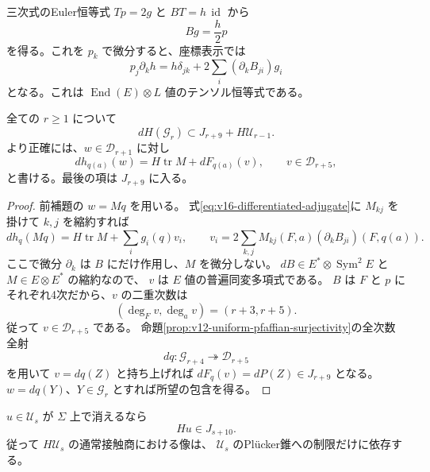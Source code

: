 三次式のEuler恒等式 $Tp=2g$ と $BT=h\,\operatorname{id}$ から
\begin{equation}\label{eq:v16-adjugate-euler}
 B g=\frac h2p
\end{equation}
を得る。これを $p_k$ で微分すると、座標表示では
\begin{equation}\label{eq:v16-differentiated-adjugate}
 p_j\partial_k h
   =h\delta_{jk}+2\sum_i(\partial_k B_{ji})g_i
\end{equation}
となる。これは $\operatorname{End}(E)\otimes L$ 値のテンソル恒等式である。

\begin{proposition}[Hessianの一次作用の全次数簡約]
\label{prop:v16-hessian-derivation-reduction}
全ての $r\ge1$ について
\begin{equation}\label{eq:v16-all-hessian-action-mod-units}
 dH(\mathcal G_r)\subset J_{r+9}+H\mathcal U_{r-1}.
\end{equation}
より正確には、$w\in\mathcal D_{r+1}$ に対し
\[
 dh_{q(a)}(w)=H\operatorname{tr}M+dF_{q(a)}(v),\qquad
 v\in\mathcal D_{r+5},
\]
と書ける。最後の項は $J_{r+9}$ に入る。
\end{proposition}

\begin{proof}
前補題の $w=Mq$ を用いる。
式\eqref{eq:v16-differentiated-adjugate}に $M_{kj}$ を掛けて $k,j$ を縮約すれば
\[
 dh_q(Mq)=H\operatorname{tr}M+\sum_i g_i(q)v_i,
 \qquad
 v_i=2\sum_{k,j}M_{kj}(F,a)(\partial_kB_{ji})(F,q(a)).
\]
ここで微分 $\partial_k$ は $B$ にだけ作用し、$M$ を微分しない。
$dB\in E^*\otimes\operatorname{Sym}^2E$ と $M\in E\otimes E^*$ の縮約なので、
$v$ は $E$ 値の普遍同変多項式である。
$B$ は $F$ と $p$ にそれぞれ4次だから、$v$ の二重次数は
\[
 (\deg_Fv,\deg_av)=(r+3,r+5).
\]
従って $v\in\mathcal D_{r+5}$ である。
命題\ref{prop:v12-uniform-pfaffian-surjectivity}の全次数全射
\[
 dq:\mathcal G_{r+4}\twoheadrightarrow\mathcal D_{r+5}
\]
を用いて $v=dq(Z)$ と持ち上げれば $dF_q(v)=dP(Z)\in J_{r+9}$ となる。
$w=dq(Y)$、$Y\in\mathcal G_r$ とすれば所望の包含を得る。
\end{proof}

\begin{proposition}[錐上で消える単元のHessian倍]
\label{prop:v16-plucker-unit-annihilation}
$u\in\mathcal U_s$ が $\Sigma$ 上で消えるなら
\begin{equation}\label{eq:v16-ideal-unit-annihilation}
 Hu\in J_{s+10}.
\end{equation}
従って $H\mathcal U_s$ の通常接触商における像は、
$\mathcal U_s$ のPl\"ucker錐への制限だけに依存する。
\end{proposition}


